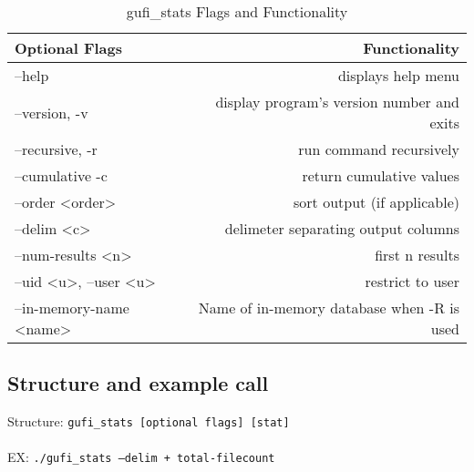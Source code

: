 \begin{table} [h]
\centering
\begin{tabular}{l|r}
Optional Flags & Functionality\\\hline
--help & displays help menu\\ 
--version, -v & display program's version number and exits \\
--recursive, -r & run command recursively \\
--cumulative -c & return cumulative values \\
--order \textless order\textgreater & sort output (if applicable)\\
--delim \textless c\textgreater & delimeter separating output columns\\
--num-results \textless n\textgreater & first n results \\
--uid \textless u\textgreater, --user \textless u\textgreater & restrict to user \\
--in-memory-name \textless name\textgreater & Name of in-memory database when -R is used
\end{tabular}
\caption{\label{fig:gufi_stats_flags}gufi\_stats Flags and Functionality}
\end{table}

\subsection{Structure and example call}
Structure: \texttt{gufi\_stats [optional flags] [stat] }
\\
\\
EX: \texttt{./gufi\_stats --delim + total-filecount}